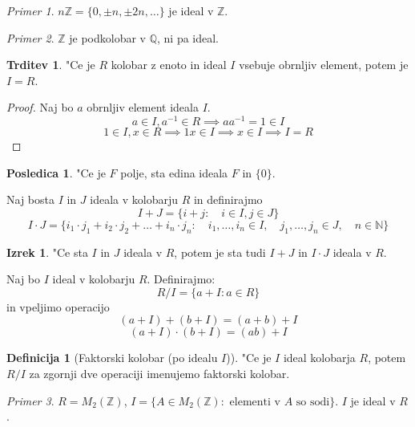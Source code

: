 \documentclass[11pt, a4paper]{article}
\theoremstyle{definition}
\newtheorem{defn}[counter]{Definicija}
\newtheorem{conseq}[counter]{Posledica}
\newtheorem{claim}[counter]{Trditev}
\newtheorem{theorem}[counter]{Izrek}
\theoremstyle{remark}
\newtheorem*{ex}{Primer}
\newcommand{\N}{\mathbb{N}}
\newcommand{\Z}{\mathbb{Z}}
\newcommand{\Q}{\mathbb{Q}}
\begin{document}
	\begin{ex}
		$n\Z = \lbrace 0, \pm n, \pm 2n, \ldots \rbrace $ je ideal v $\Z$.
	\end{ex}
	\begin{ex}
		$\Z$ je podkolobar v $\Q$, ni pa ideal.
	\end{ex}
	
	\begin{claim}
		"Ce je $R$ kolobar z enoto in ideal $I$ vsebuje obrnljiv element, potem je $I = R$.
	\end{claim}
	\begin{proof}
		Naj bo $a$ obrnljiv element ideala $I$.
		\[ a \in I, a^{-1} \in R \implies aa^{-1} = 1 \in I \]
		\[ 1 \in I, x \in R \implies 1x \in I \implies x \in I \implies I = R \]
	\end{proof}
	\begin{conseq}
		"Ce je $F$ polje, sta edina ideala $F$ in $\lbrace 0 \rbrace$.
	\end{conseq}

	Naj bosta $I$ in $J$ ideala v kolobarju $R$ in definirajmo
	\[ I + J = \lbrace i+j : \quad i \in I, j \in J \rbrace \]
	\[ I \cdot J = \lbrace i_1 \cdot j_1 + i_2 \cdot j_2 + \ldots + i_n \cdot j_n:
	\quad i_1, \ldots, i_n \in I,
	\quad j_1, \ldots, j_n \in J,
	\quad n \in \N \rbrace \]
	
	\begin{theorem}
		"Ce sta $I$ in $J$ ideala v $R$, potem je sta tudi $I+J$ in $I \cdot J$ ideala v $R$.
	\end{theorem}
	Naj bo $I$ ideal v kolobarju $R$. Definirajmo:
	\[ R / I = \lbrace a + I: a \in R \rbrace \]
	in vpeljimo operacijo
	\[ (a + I) + (b + I) = (a + b) + I \]
	\[ (a + I) \cdot (b + I) = (ab) + I \]
	\begin{defn}[Faktorski kolobar (po idealu $I$)]
		"Ce je $I$ ideal kolobarja $R$, potem $R/I$ za zgornji dve operaciji imenujemo faktorski kolobar.
	\end{defn}

	\begin{ex}
		$R = M_2(\Z)$, $I = \lbrace A \in M_2(\Z): \text{ elementi v }A\text{ so sodi} \rbrace$.
		$I$ je ideal v $R$.
	\end{ex}


\end{document}
